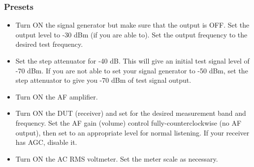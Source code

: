\documentclass[10pt,letterpaper]{book}
\begin{document}
\subsubsection*{Presets}
\begin{itemize}
	\item Turn ON the signal generator but make sure that the output is OFF. Set the output level to -30 dBm (if you are able to). Set the output frequency to the desired test frequency.
	\item Set the step attenuator for -40 dB. This will give an initial test signal level of -70 dBm. If you are not able to set your signal generator to -50 dBm, set the step attenuator to give you -70 dBm of test signal output.
	\item Turn ON the AF amplifier.
	\item Turn ON the DUT (receiver) and set for the desired measurement band and frequency. Set the AF gain (volume) control fully-counterclockwise (no AF output), then set to an appropriate level for normal listening. If your receiver has AGC, disable it.
	\item Turn ON the AC RMS voltmeter. Set the meter scale as necessary.
\end{itemize}
\end{document}
